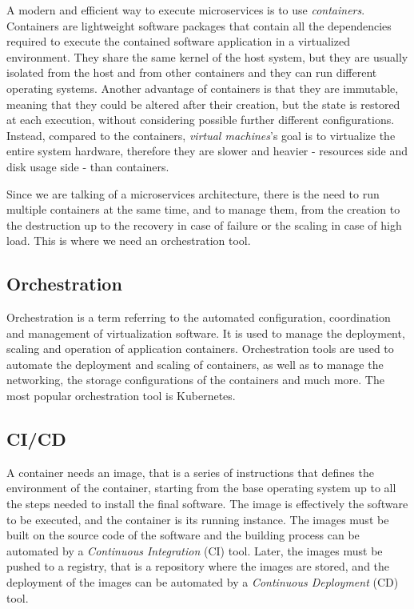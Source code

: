A modern and efficient way to execute microservices is to use \textit{containers}. \\
Containers are lightweight software packages that contain all the dependencies required to execute the contained software application in a virtualized environment. They share the same kernel of the host system, but they are usually isolated from the host and from other containers and they can run different operating systems. Another advantage of containers is that they are immutable, meaning that they could be altered after their creation, but the state is restored at each execution, without considering possible further different configurations.\\
Instead, compared to the containers, \textit{virtual machines}'s goal is to virtualize the entire system hardware, therefore they are slower and heavier - resources side and disk usage side - than containers.

Since we are talking of a microservices architecture, there is the need to run multiple containers at the same time, and to manage them, from the creation to the destruction up to the recovery in case of failure or the scaling in case of high load. This is where we need an orchestration tool.

\subsection{Orchestration}

Orchestration is a term referring to the automated configuration, coordination and management of virtualization software. It is used to manage the deployment, scaling and operation of application containers. Orchestration tools are used to automate the deployment and scaling of containers, as well as to manage the networking, the storage configurations of the containers and much more. The most popular orchestration tool is Kubernetes.

\subsection{CI/CD}

A container needs an image, that is a series of instructions that defines the environment of the container, starting from the base operating system up to all the steps needed to install the final software. The image is effectively the software to be executed, and the container is its running instance. The images must be built on the source code of the software and the building process can be automated by a \textit{Continuous Integration} (CI) tool. Later, the images must be pushed to a registry, that is a repository where the images are stored, and the deployment of the images can be automated by a \textit{Continuous Deployment} (CD) tool.

